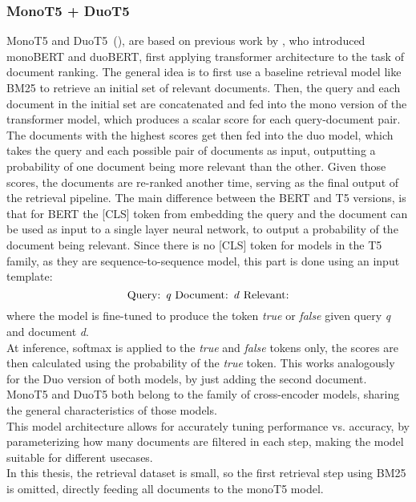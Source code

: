 \subsubsection{MonoT5 + DuoT5}\label{sec:monot5-duot5}
MonoT5 and DuoT5~(\cite{roberts:2019}), are based on previous work by \cite{nogueira:2019}, who introduced monoBERT and duoBERT, first applying transformer architecture to the task of document ranking.
The general idea is to first use a baseline retrieval model like BM25 to retrieve an initial set of relevant documents.
Then, the query and each document in the initial set are concatenated and fed into the mono version of the transformer model, which produces a scalar score for each query-document pair.
The documents with the highest scores get then fed into the duo model, which takes the query and each possible pair of documents as input, outputting a probability of one document being more relevant than the other.
Given those scores, the documents are re-ranked another time, serving as the final output of the retrieval pipeline.
The main difference between the BERT and T5 versions, is that for BERT the [CLS] token from embedding the query and the document can be used as input to a single layer neural network, to output a probability of the document being relevant.
Since there is no [CLS] token for models in the T5 family, as they are sequence-to-sequence model, this part is done using an input template:
\begin{equation}
    \text{Query: \emph{q} Document: \emph{d} Relevant:}
\end{equation} 
where the model is fine-tuned to produce the token \emph{true} or \emph{false} given query \emph{q} and document \emph{d}.
\\
At inference, softmax is applied to the \emph{true} and \emph{false} tokens only, the scores are then calculated using the probability of the \emph{true} token.
This works analogously for the Duo version of both models, by just adding the second document.
MonoT5 and DuoT5 both belong to the family of cross-encoder models, sharing the general characteristics of those models.
\\
This model architecture allows for accurately tuning performance vs. accuracy, by parameterizing how many documents are filtered in each step, making the model suitable for different usecases.
\\
In this thesis, the retrieval dataset is small, so the first retrieval step using BM25 is omitted, directly feeding all documents to the monoT5 model.

